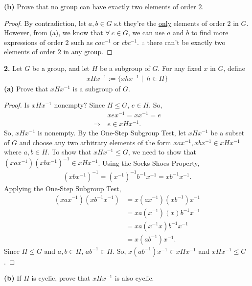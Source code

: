 \documentclass[12pt, letterpaper]{article}
\begin{document}
\textbf{(b)} Prove that no group can have exactly two elements of order $2$.
\begin{proof}
    By contradiction, let $a,b \in G$ s.t they're the \underline{only} elements of order $2$ in $G$. However, from (a), we know that $\forall \ c \in G$, we can use $a$ and $b$ to find more expressions of order $2$ such as $cac^{-1}$ or $cbc^{-1}$. $\therefore$ there can't be exactly two elements of order $2$ in any group. 
\end{proof} 
\vspace{0.2em}
\textbf{2.} Let $G$ be a group, and let $H$ be a subgroup of $G$. For any fixed $x$ in $G$, define
\begin{align*}
    xHx^{-1} := \{xhx^{-1} \mid \  h \in H\}
\end{align*} \vspace{0.2em}
\indent \textbf{(a)} Prove that $xHx^{-1}$ is a subgroup of $G$.
\begin{proof}
    Is $xHx^{-1}$ nonempty? Since $H \leq G$, $e \in H$. So,
    \begin{align*}
        &xex^{-1} = xx^{-1} = e\\ 
        \Rightarrow \ &e \in xHx^{-1}.
    \end{align*}
    So, $xHx^{-1}$ is nonempty. By the One-Step Subgroup Test, let $xHx^{-1}$ be a subset of $G$ and choose any two arbitrary elements of the form $xax^{-1}, xbx^{-1} \in xHx^{-1}$ where $a,b\in H$. To show that $xHx^{-1} \leq G$, we need to show that $(xax^{-1})(xbx^{-1})^{-1} \in xHx^{-1}$. Using the Socks-Shoes Property,
    \begin{align*}
        (xbx^{-1})^{-1} = (x^{-1})^{-1}b^{-1}x^{-1} = xb^{-1}x^{-1}.
    \end{align*}
    Applying the One-Step Subgroup Test,
    \begin{align*}
        (xax^{-1})(xb^{-1}x^{-1}) &= x(ax^{-1})(xb^{-1})x^{-1} \\
        &= xa(x^{-1})(x)b^{-1}x^{-1} \\
        &= xa(x^{-1}x)b^{-1}x^{-1} \\
        &= x(ab^{-1})x^{-1}.
    \end{align*}
    Since $H \leq G$ and $a,b \in H$, $ab^{-1} \in H$. So, $x(ab^{-1})x^{-1} \in xHx^{-1}$ and $xHx^{-1} \leq G$.
\end{proof}
\indent \textbf{(b)} If $H$ is cyclic, prove that $xHx^{-1}$ is also cyclic.
\end{document}
